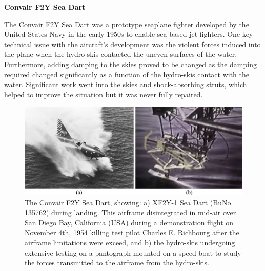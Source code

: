 \documentclass[12pt,letter]{article}
\begin{document}
		\begin{vibration_case_study}

			\textbf{Convair F2Y Sea Dart}

			\noindent The Convair F2Y Sea Dart was a prototype seaplane fighter developed by the United States Navy in the early 1950s to enable sea-based jet fighters. One key technical issue with the aircraft's development was the violent forces induced into the plane when the hydro-skis contacted the uneven surfaces of the water. Furthermore, adding damping to the skies proved to be changed as the damping required changed significantly as a function of the hydro-skis contact with the water. Significant work went into the skies and shock-absorbing struts, which helped to improve the situation but it was never fully repaired.
			
			
			\begin{figure}[H]
				\centering
				\includegraphics[width=6.0in]{../figures/Convair_F2Y_SeaDart}
				\caption{The  Convair F2Y Sea Dart, showing: a) XF2Y-1 Sea Dart (BuNo 135762) during landing. This airframe disintegrated in mid-air over San Diego Bay, California (USA) during a demonstration flight on November 4th, 1954 killing test pilot Charles E. Richbourg after the airframe limitations were exceed\protect\footnotemark[1], and b) the hydro-skis undergoing extensive testing on a pantograph mounted on a speed boat to study the forces transmitted to the airframe from the hydro-skis\protect\footnotemark[2].}
			\end{figure}
		\end{vibration_case_study}
	
\end{document}
